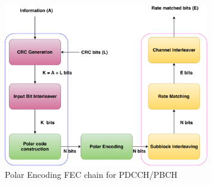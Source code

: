 \begin{figure}[!htb]
	\centering
	\includegraphics[width=0.8\textwidth]{./figures/5GFECChain.pdf}
	\caption{Polar Encoding FEC chain for PDCCH/PBCH}
	\label{fig:5g_fec_chain}
\end{figure}